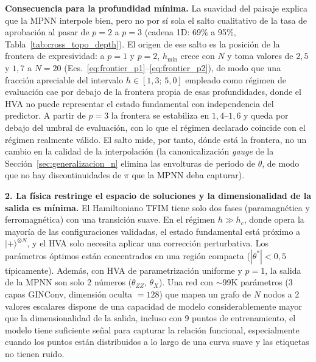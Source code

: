 \documentclass[11pt,a4paper,spanish]{book}
\begin{document}
\textbf{Consecuencia para la profundidad mínima.} La suavidad del paisaje explica que la MPNN interpole bien, pero no por sí sola el salto cualitativo de la tasa de aprobación al pasar de $p = 2$ a $p = 3$ (cadena 1D: 69\% a 95\%, Tabla~\ref{tab:cross_topo_depth}). El origen de ese salto es la posición de la frontera de expresividad: a $p = 1$ y $p = 2$, $h_{\min}$ crece con $N$ y toma valores de $2,5$ y $1,7$ a $N = 20$ (Ecs.~\ref{eq:frontier_p1}--\ref{eq:frontier_p2}), de modo que una fracción apreciable del intervalo $h \in [1{,}3;\, 5{,}0]$ empleado como régimen de evaluación cae por debajo de la frontera propia de esas profundidades, donde el HVA no puede representar el estado fundamental con independencia del predictor. A partir de $p = 3$ la frontera se estabiliza en $1,4$--$1,6$ y queda por debajo del umbral de evaluación, con lo que el régimen declarado coincide con el régimen realmente válido. El salto mide, por tanto, dónde está la frontera, no un cambio en la calidad de la interpolación (la canonicalización \emph{gauge} de la Sección~\ref{sec:generalizacion_n} elimina las envolturas de periodo de $\theta$, de modo que no hay discontinuidades de $\pi$ que la MPNN deba capturar).

\textbf{2. La física restringe el espacio de soluciones y la dimensionalidad de la salida es mínima.} El Hamiltoniano TFIM tiene solo dos fases (paramagnética y ferromagnética) con una transición suave. En el régimen $h \gg h_c$, donde opera la mayoría de las configuraciones validadas, el estado fundamental está próximo a $|+\rangle^{\otimes N}$, y el HVA solo necesita aplicar una corrección perturbativa. Los parámetros óptimos están concentrados en una región compacta ($|\theta^*| < 0,5$ típicamente). Además, con HVA de parametrización uniforme y $p = 1$, la salida de la MPNN son solo 2 números ($\theta_{ZZ}$, $\theta_X$). Una red con $\sim$99K parámetros (3 capas GINConv, dimensión oculta $= 128$) que mapea un grafo de $N$ nodos a 2 valores escalares dispone de una capacidad de modelo considerablemente mayor que la dimensionalidad de la salida, incluso con 9 puntos de entrenamiento, el modelo tiene suficiente señal para capturar la relación funcional, especialmente cuando los puntos están distribuidos a lo largo de una curva suave y las etiquetas no tienen ruido.
\end{document}
